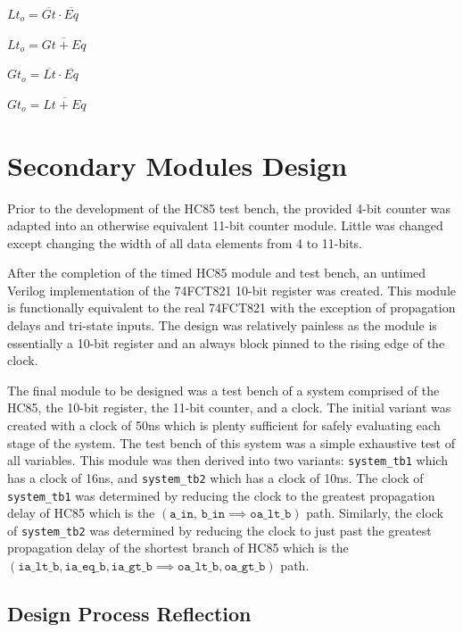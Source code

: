\documentclass[12pt,letterpaper,titlepage]{article}
\begin{document}
\begin{raggedright}
\begin{paracol}{3}
$Lt_o = \overline{Gt}\cdot\overline{Eq}$

$Lt_o = \overline{Gt + Eq}$

\switchcolumn
\centering
{}

$Gt_o = \overline{Lt}\cdot\overline{Eq}$

$Gt_o = \overline{Lt + Eq}$
\end{paracol}
\pagebreak
\section{Secondary Modules Design}

Prior to the development of the HC85 test bench, the provided 4-bit counter was adapted into an otherwise equivalent 11-bit counter module. Little was changed except changing the width of all data elements from 4 to 11-bits.

After the completion of the timed HC85 module and test bench, an untimed Verilog implementation of the 74FCT821 10-bit register was created. This module is functionally equivalent to the real 74FCT821 with the exception of propagation delays and tri-state inputs. The design was relatively painless as the module is essentially a 10-bit register and an always block pinned to the rising edge of the clock.

The final module to be designed was a test bench of a system comprised of the HC85, the 10-bit register, the 11-bit counter, and a clock. The initial variant was created with a clock of 50ns which is plenty sufficient for safely evaluating each stage of the system. The test bench of this system was a simple exhaustive test of all variables. This module was then derived into two variants: \texttt{system\_tb1} which has a clock of 16ns, and \texttt{system\_tb2} which has a clock of 10ns. The clock of \texttt{system\_tb1} was determined by reducing the clock to the greatest propagation delay of HC85 which is the $(\texttt{a\_in, b\_in} \implies \texttt{oa\_lt\_b})$ path. Similarly, the clock of \texttt{system\_tb2} was determined by reducing the clock to just past the greatest propagation delay of the shortest branch of HC85 which is the $(\texttt{ia\_lt\_b}, \texttt{ia\_eq\_b}, \texttt{ia\_gt\_b} \implies \texttt{oa\_lt\_b}, \texttt{oa\_gt\_b})$ path.

\pagebreak
\subsection*{Design Process Reflection}


\end{raggedright}
\end{document}

